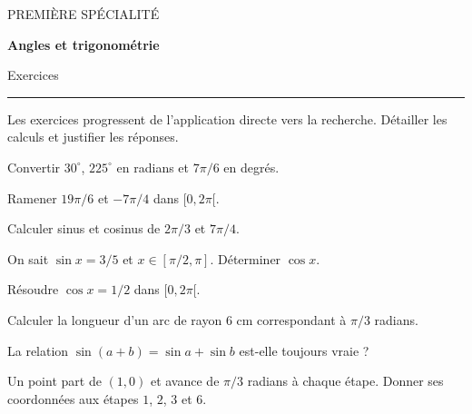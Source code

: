 \documentclass[11pt,a4paper]{article}
\begin{document}
{\small\color{Blue}PREMIÈRE SPÉCIALITÉ}\par{\LARGE\bfseries Angles et trigonométrie}\par{\large Exercices}\par\vspace{0.2cm}\hrule\vspace{0.4cm}
Les exercices progressent de l’application directe vers la recherche. Détailler les calculs et justifier les réponses.
\par\noindent\begin{minipage}{\linewidth}
Convertir $30^\circ$, $225^\circ$ en radians et $7\pi/6$ en degrés.
\end{minipage}\par
\par\noindent\begin{minipage}{\linewidth}
Ramener $19\pi/6$ et $-7\pi/4$ dans $[0,2\pi[$.
\end{minipage}\par
\par\noindent\begin{minipage}{\linewidth}
Calculer sinus et cosinus de $2\pi/3$ et $7\pi/4$.
\end{minipage}\par
\par\noindent\begin{minipage}{\linewidth}
On sait $\sin x=3/5$ et $x\in[\pi/2,\pi]$. Déterminer $\cos x$.
\end{minipage}\par
\par\noindent\begin{minipage}{\linewidth}
Résoudre $\cos x=1/2$ dans $[0,2\pi[$.
\end{minipage}\par
\par\noindent\begin{minipage}{\linewidth}
Calculer la longueur d’un arc de rayon $6$ cm correspondant à $\pi/3$ radians.
\end{minipage}\par
\par\noindent\begin{minipage}{\linewidth}
La relation $\sin(a+b)=\sin a+\sin b$ est-elle toujours vraie ?
\end{minipage}\par
\par\noindent\begin{minipage}{\linewidth}
Un point part de $(1,0)$ et avance de $\pi/3$ radians à chaque étape. Donner ses coordonnées aux étapes $1$, $2$, $3$ et $6$.
\end{minipage}\par
\end{document}
